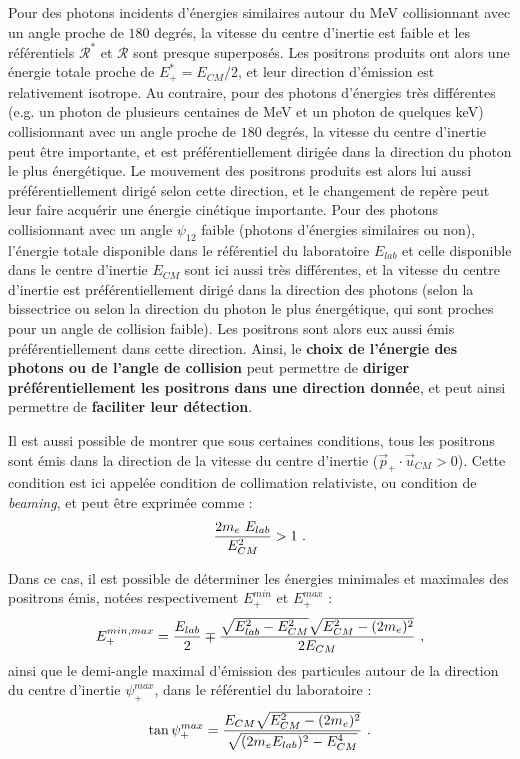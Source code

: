 \begin{refsection}
Pour des photons incidents d'énergies similaires autour du MeV collisionnant avec un angle proche de $180$ degrés, la vitesse du centre d'inertie est faible et les référentiels $\mathcal{R}^*$ et $\mathcal{R}$ sont presque superposés. Les positrons produits ont alors une énergie totale proche de $E_+^*=E_{CM}/2$, et leur direction d'émission est relativement isotrope. Au contraire, pour des photons d'énergies très différentes (e.g. un photon de plusieurs centaines de MeV et un photon de quelques keV) collisionnant avec un angle proche de $180$ degrés, la vitesse du centre d'inertie peut être importante, et est préférentiellement dirigée dans la direction du photon le plus énergétique. Le mouvement des positrons produits est alors lui aussi préférentiellement dirigé selon cette direction, et le changement de repère peut leur faire acquérir une énergie cinétique importante. Pour des photons collisionnant avec un angle $\psi_{12}$ faible (photons d'énergies similaires ou non), l'énergie totale disponible dans le référentiel du laboratoire $E_{lab}$ et celle disponible dans le centre d'inertie $E_{CM}$ sont ici aussi très différentes, et la vitesse du centre d'inertie est préférentiellement dirigé dans la direction des photons (selon la bissectrice ou selon la direction du photon le plus énergétique, qui sont proches pour un angle de collision faible). Les positrons sont alors eux aussi émis préférentiellement dans cette direction. Ainsi, le \textbf{choix de l'énergie des photons ou de l'angle de collision} peut permettre de \textbf{diriger préférentiellement les positrons dans une direction donnée}, et peut ainsi permettre de \textbf{faciliter leur détection}.

Il est aussi possible de montrer \parencite{ribeyre_2017} que sous certaines conditions, tous les positrons sont émis dans la direction de la vitesse du centre d'inertie ($\vec{p}_+ \cdot \vec{u}_{CM}>0$). Cette condition est ici appelée condition de collimation relativiste, ou condition de \textit{beaming}, et peut être exprimée comme :
\begin{equation}
    \dfrac{2 m_e ~ E_{lab}}{E_{CM}^2}>1 ~ \rm .
\end{equation}

Dans ce cas, il est possible \parencite{ribeyre_2017} de déterminer les énergies minimales et maximales des positrons émis, notées respectivement $E_+^{min}$ et $E_+^{max}$ :
\begin{equation}
    E_+^{min,max}   = \dfrac{E_{lab}}{2} \mp \dfrac{\sqrt{E_{lab}^2 - E_{CM}^2} \sqrt{E_{CM}^2 - (2 m_e)^2}}{2 E_{CM}} ~ \rm ,
\end{equation}
ainsi que le demi-angle maximal d'émission des particules autour de la direction du centre d'inertie $\psi_+^{max}$, dans le référentiel du laboratoire \parencite{ribeyre_2017} :
\begin{equation}
    \tan \psi_+^{max} = \dfrac{E_{CM} \sqrt{E_{CM}^2 - (2 m_e)^2}}{\sqrt{(2 m_e E_{lab})^2 - E_{CM}^4}} ~ \rm .
\end{equation}


\end{refsection}
